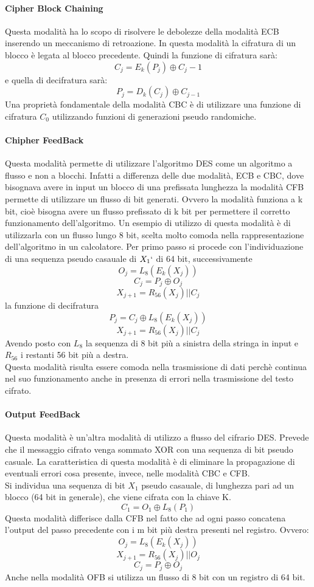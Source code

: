 \documentclass[11pt, a4paper, oneside]{Thesis} %
\begin{document}
\paragraph{Cipher Block Chaining} Questa modalità ha lo scopo di risolvere le debolezze della modalità ECB inserendo un meccanismo di retroazione. In questa modalità
la cifratura di un blocco è legata al blocco precedente. Quindi la funzione di cifratura sarà:
\[ C_j = E_k(P_j) \oplus C_j-1 \] 
e quella di decifratura sarà:
\[ P_j = D_k(C_j) \oplus C_{j-1} \]
Una proprietà fondamentale della modalità CBC è di utilizzare una funzione di cifratura $C_0$ utilizzando funzioni di generazioni pseudo randomiche.

\paragraph{Chipher FeedBack} Questa modalità permette di utilizzare l'algoritmo DES come un algoritmo a flusso e non a blocchi. Infatti a differenza delle due modalità,
ECB e CBC, dove bisognava avere in input un blocco di una prefissata lunghezza la modalità CFB permette di utilizzare un flusso di bit generati.
Ovvero la modalità funziona a k bit, cioè bisogna avere un flusso prefissato di k bit per permettere il corretto funzionamento dell'algoritmo.
Un esempio di utilizzo di questa modalità è di utilizzarla con un flusso lungo 8 bit, scelta molto comoda nella rappresentazione dell'algoritmo in un calcolatore.
Per primo passo si procede con l'individuazione di una sequenza pseudo casauale di $X_1`$ di 64 bit, successivamente
\[ O_j = L_8(E_k(X_j)) \]
\[ C_j = P_j \oplus O_j \]
\[ X_{j+1} = R_{56}(X_j) || C_j\]
la funzione di decifratura
\[ P_j = C_j \oplus L_8(E_k(X_j)) \]
\[ X_{j+1} = R_{56}(X_j)|| C_j \]
Avendo posto con $L_8$ la sequenza di 8 bit più a sinistra della stringa in input e $R_{56}$ i restanti 56 bit più a destra.
\\Questa modalità risulta essere comoda nella trasmissione di dati perchè continua nel suo funzionamento anche in presenza di errori nella trasmissione del testo cifrato.

\paragraph{Output FeedBack} Questa modalità è un'altra modalità di utilizzo a flusso del cifrario DES. Prevede che il messaggio cifrato venga sommato XOR con una sequenza 
di bit pseudo casuale. La caratteristica di questa modalità è di eliminare la propagazione di eventuali errori cosa presente, invece, nelle modalità CBC e CFB. 
\\ Si individua una sequenza di bit $X_1$ pseudo casauale, di lunghezza pari ad un blocco (64 bit in generale), che viene cifrata con la chiave K. 
\[ C_1 = O_1 \oplus L_8(P_1)\]
Questa modalità differisce dalla CFB nel fatto che ad ogni passo concatena l'output del passo precedente con i m bit più destra presenti nel registro. Ovvero:
\[ O_j = L_8(E_k(X_j)) \]
\[ X_{j+1} = R_{56}(X_j)||O_j \]
\[ C_j = P_j \oplus O_j \]
Anche nella modalità OFB si utilizza un flusso di 8 bit con un registro di 64 bit.
\end{document}
